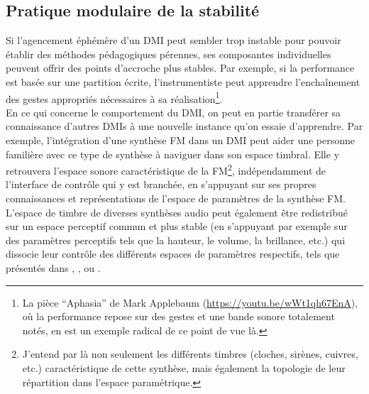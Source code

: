 \subsection{Pratique modulaire de la stabilité}

\noindent Si l'agencement éphémère d'un \gls{DMI} peut sembler trop instable pour pouvoir établir des méthodes pédagogiques pérennes, ses composantes individuelles peuvent offrir des points d'accroche plus stables. Par exemple, si la performance est basée sur une partition écrite, l'instrumentiste peut apprendre l'enchaînement des gestes appropriés nécessaires à sa réalisation\footnote{La pièce ``Aphasia'' de Mark Applebaum (\url{https://youtu.be/wWt1qh67EnA}), où la performance repose sur des gestes et une bande sonore totalement notés, en est un exemple radical de ce point de vue là.}.\\
\indent En ce qui concerne le comportement du \gls{DMI}, on peut en partie transférer sa connaissance d'autres \glspl{DMI} à une nouvelle instance qu'on essaie d'apprendre. Par exemple, l'intégration d'une synthèse \gls{FM} dans un \gls{DMI} peut aider une personne familière avec ce type de synthèse à naviguer dans son espace timbral. Elle y retrouvera l'espace sonore caractéristique de la \gls{FM}\footnote{J'entend par là non seulement les différents timbres (cloches, sirènes, cuivres, etc.) caractéristique de cette synthèse, mais également la topologie de leur répartition dans l'espace paramétrique.}, indépendamment de l'interface de contrôle qui y est branchée, en s'appuyant sur ses propres connaissances et représentations de l'espace de paramètres de la synthèse \gls{FM}. L'espace de timbre de diverses synthèses audio peut également être redistribué sur un espace perceptif commun et plus stable (en s'appuyant par exemple sur des paramètres perceptifs tels que la hauteur, le volume, la brillance, etc.) qui dissocie leur contrôle des différents espaces de paramètres respectifs, tels que présentés dans \cite{wessel_timbre_1979}, \cite{arfib_strategies_2002}, \cite{schwarz_sound_2012} ou \cite{tubb_divergent_2014}.

